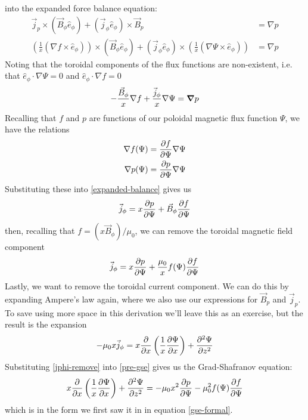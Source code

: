 into the expanded force balance equation:
\begin{align*}
    \vec{j}_p \times (\vec{B}_\phi \hat{e}_{\phi}) + (\vec{j}_{\phi} \hat{e}_{\phi}) \times \vec{B}_p &= \nabla p \\
    \left ( \frac{1}{x} \left ( \nabla f \times \hat{e}_{\phi} \right ) \right ) \times (\vec{B}_\phi \hat{e}_{\phi}) + (\vec{j}_{\phi} \hat{e}_{\phi}) \times \left ( \frac{1}{x} \left ( \nabla \Psi \times \hat{e}_{\phi} \right ) \right ) &= \nabla p
\end{align*}
Noting that the toroidal components of the flux functions are non-existent, i.e. that $\hat{e}_{\phi} \cdot \nabla \Psi = 0$ and $\hat{e}_{\phi} \cdot \nabla f = 0$
\begin{equation}
    \label{expanded-balance} -\frac{\vec{B}_{\phi}}{x} \nabla f  + \frac{\vec{j}_{\phi}}{x} \nabla \Psi = \grad p
\end{equation}
Recalling that $f$ and $p$ are functions of our poloidal magnetic flux function $\Psi$, we have the relations
\begin{align*}
    \nabla f(\Psi) &= \pdv{f}{\Psi} \nabla \Psi \\
    \nabla p(\Psi) &= \pdv{p}{\Psi} \nabla \Psi
\end{align*}
Substituting these into \ref{expanded-balance} gives us
\begin{equation}
    \vec{j}_{\phi} = x \pdv{p}{\Psi} + \vec{B}_{\phi} \pdv{f}{\Psi}
\end{equation}
then, recalling that $f = (x \vec{B}_{\phi}) / \mu_0$, we can remove the toroidal magnetic field component
\begin{equation}
    \label{pre-gse} \vec{j}_{\phi} = x \pdv{p}{\Psi} + \frac{\mu_0}{x} f(\Psi) \pdv{f}{\Psi}
\end{equation}
Lastly, we want to remove the toroidal current component. We can do this by expanding Ampere's law again, where 
we also use our expressions for $\vec{B}_p$ and $\vec{j}_p$. To save using more space in this derivation we'll leave this 
as an exercise, but the result is the expansion
\begin{equation}
    \label{jphi-remove} -\mu_0 x \vec{j}_{\phi} = x \pdv{x} \left (\frac{1}{x} \pdv{\Psi}{x} \right ) + \pdv[2]{\Psi}{z}
\end{equation}
Substituting \ref{jphi-remove} into \ref{pre-gse} gives us the Grad-Shafranov equation:
\begin{equation}
    x \pdv{x} \left ( \frac{1}{x} \pdv{\Psi}{x} \right ) + \pdv[2]{\Psi}{z} = -\mu_0 x^2 \pdv{p}{\Psi} - \mu_0^2 f(\Psi) \pdv{f}{\Psi}
\end{equation}
which is in the form we first saw it in in equation \ref{gse-formal}.

